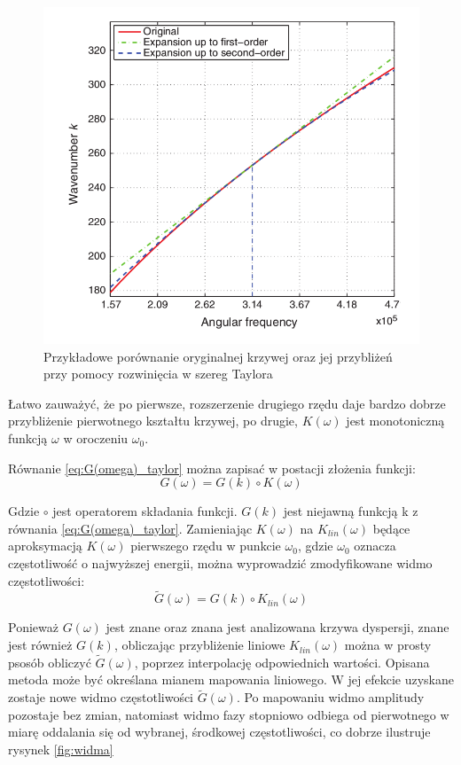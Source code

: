 \begin{figure}[h]
\centering
\includegraphics[width=14cm]{Zdjecia/4/buba}
\caption{Przykładowe porównanie oryginalnej krzywej oraz jej przybliżeń przy pomocy rozwinięcia w szereg Taylora}
\label{fig:krzywa_taylorem}
\end{figure}

Łatwo zauważyć, że po pierwsze, rozszerzenie drugiego rzędu daje bardzo dobrze przybliżenie pierwotnego kształtu krzywej, po drugie, $K(\omega)$ jest monotoniczną funkcją $\omega$ w oroczeniu $\omega _0$. 

Równanie \ref{eq:G(omega)_taylor} można zapisać w postacji złożenia funkcji:
\begin{equation}
G(\omega) = G(k)\circ K(\omega)
\end{equation}

Gdzie $\circ$ jest operatorem składania funkcji. $G(k)$ jest niejawną funkcją k z równania \ref{eq:G(omega)_taylor}. Zamieniając $K(\omega)$ na $K_{lin}(\omega)$ będące aproksymacją $K(\omega)$ pierwszego rzędu w punkcie $\omega _0$, gdzie $\omega _0$ oznacza częstotliwość o najwyższej energii, można wyprowadzić zmodyfikowane widmo częstotliwości:
\begin{equation}
\widetilde{G}(\omega) = G(k)\circ K_{lin}(\omega)
\end{equation}

Ponieważ $G(\omega)$ jest znane oraz znana jest analizowana krzywa dyspersji, znane jest również $G(k)$, obliczając przybliżenie liniowe $K_{lin}(\omega)$ można w prosty psosób obliczyć $\widetilde{G}(\omega)$, poprzez interpolację odpowiednich wartości. Opisana metoda może być określana mianem mapowania liniowego. W jej efekcie uzyskane zostaje nowe widmo częstotliwości $\widetilde{G}(\omega)$. Po mapowaniu widmo amplitudy pozostaje bez zmian, natomiast widmo fazy stopniowo odbiega od pierwotnego w miarę oddalania się od wybranej, środkowej częstotliwości, co dobrze ilustruje rysynek \ref{fig:widma}

